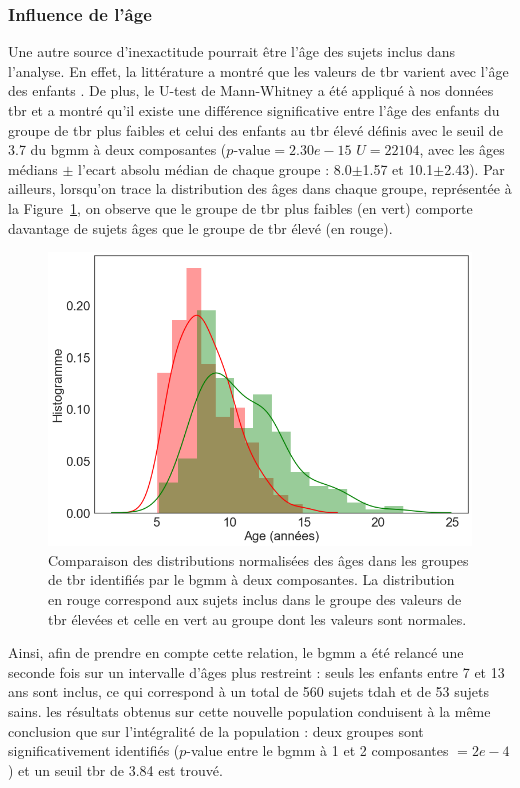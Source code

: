 \subsubsection{Influence de l'âge}

Une autre source d'inexactitude pourrait être l'âge des sujets inclus dans l'analyse. En effet, la littérature a montré que les valeurs de \gls{tbr} varient
avec l'âge des enfants \citep{Liechti2013, Snyder2015, Perone2018}. De plus, le U-test de Mann-Whitney a été appliqué à nos données \gls{tbr} et a montré
qu'il existe une différence significative entre l'âge des enfants du groupe de \gls{tbr} plus faibles et celui des enfants au \gls{tbr} élevé définis avec 
le seuil de 3.7 du \gls{bgmm} à deux composantes
($p\text{-value} = 2.30e-15$\text{,} $U = 22 104$, avec les âges médians $\pm$ l'ecart absolu médian de chaque groupe : 8.0$\pm$1.57 et 10.1$\pm$2.43). Par ailleurs, lorsqu'on trace
la distribution des âges dans chaque groupe, représentée à la Figure~\ref{Figure:tbr_age_distribution}, on observe que le groupe de \gls{tbr} plus faibles (en vert) comporte 
davantage de sujets âges que le groupe de \gls{tbr} élevé (en rouge). 

\begin{figure}[h!]
  \centering
	\includegraphics[width=0.7\linewidth]{figures/chapter-4/tbr-age-distribution} 
  \caption[Comparaison des distributions normalisées des âges dans les groupes de \gls{tbr} identifiés par le \gls{bgmm} à deux composantes.]{Comparaison des distributions 
	normalisées des âges dans les groupes de \gls{tbr} identifiés par le \gls{bgmm} à deux composantes. La distribution
	en rouge correspond aux sujets inclus dans le groupe des valeurs de \gls{tbr} élevées et celle en vert au groupe dont les valeurs sont normales.}
  \label{Figure:tbr_age_distribution}
\end{figure}

Ainsi, afin de prendre en compte cette relation, le \gls{bgmm} a été relancé une seconde fois sur un intervalle d'âges plus restreint : seuls les enfants
entre 7 et 13 ans sont inclus, ce qui correspond à un total de 560 sujets \gls{tdah} et de 53 sujets sains. les résultats obtenus sur cette nouvelle population 
conduisent à la même conclusion que sur l'intégralité de la population : deux groupes sont significativement identifiés ($p$-value entre le \gls{bgmm} à 1 et 2 
composantes $= 2e-4$) et un seuil \gls{tbr} de 3.84 est trouvé. 

